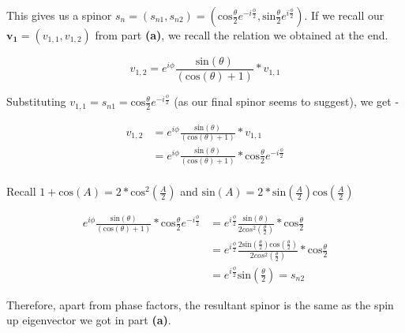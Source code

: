\begin{alphaparts}
This gives us a spinor $s_{n} = (s_{n1}, s_{n2}) = (\textrm{cos}\frac{\theta}{2}e^{-i\frac{\phi}{2}}, \textrm{sin}\frac{\theta}{2}e^{i\frac{\phi}{2}})$. If we recall our $\mathbf{v_{1}} = (v_{1,1}, v_{1,2})$ from part \textbf{(a)}, we recall the relation we obtained at the end.

\begin{equation*}
    v_{1,2} = e^{i\phi}\frac{\textrm{sin}(\theta)}{(\textrm{cos}(\theta) + 1)}*v_{1,1}
\end{equation*}

Substituting $v_{1,1} = s_{n1} = \textrm{cos}\frac{\theta}{2}e^{-i\frac{\phi}{2}}$ (as our final spinor seems to suggest), we get - 

\begin{equation*}
    \begin{split}
        v_{1,2} & = e^{i\phi}\frac{\textrm{sin}(\theta)}{(\textrm{cos}(\theta) + 1)}*v_{1,1} \\
        & = e^{i\phi}\frac{\textrm{sin}(\theta)}{(\textrm{cos}(\theta) + 1)}*\textrm{cos}\frac{\theta}{2}e^{-i\frac{\phi}{2}} \\
    \end{split}
\end{equation*}

Recall $1 + \textrm{cos}(A) = 2*\textrm{cos}^{2}(\frac{A}{2})$ and $\textrm{sin}(A) = 2*\textrm{sin}(\frac{A}{2})\textrm{cos}(\frac{A}{2})$

\begin{equation*}
    \begin{split}
        e^{i\phi}\frac{\textrm{sin}(\theta)}{(\textrm{cos}(\theta) + 1)}*\textrm{cos}\frac{\theta}{2}e^{-i\frac{\phi}{2}} & = e^{i\frac{\phi}{2}}\frac{\textrm{sin}(\theta)}{2cos^{2}(\frac{\theta}{2})}*\textrm{cos}\frac{\theta}{2} \\
        & = e^{i\frac{\phi}{2}}\frac{2\textrm{sin}(\frac{\theta}{2})\textrm{cos}(\frac{\theta}{2})}{2cos^{2}(\frac{\theta}{2})}*\textrm{cos}\frac{\theta}{2} \\
        & = e^{i\frac{\phi}{2}}\textrm{sin}(\frac{\theta}{2}) = s_{n2}
    \end{split}
\end{equation*}

Therefore, apart from phase factors, the resultant spinor is the same as the spin up eigenvector we got in part \textbf{(a)}.


\end{alphaparts}
